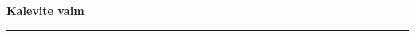 \documentclass[10pt]{book}
\begin{document}
{
  \samepage
  \raggedbottom
  \raggedright
  \sloppy


  \vspace{0.2in}

  \noindent\begin{minipage}{.1\textwidth}
    \hfill\vspace{0.1in}
  \end{minipage}%
  \noindent\begin{minipage}{.8\textwidth}
    \centering
    \bfseries
    \large Kalevite vaim
  \end{minipage}%
  \noindent\begin{minipage}{.1\textwidth}
      \hfill\vspace{0.1in}
  \end{minipage}

  \nopagebreak[4]
  \vspace{0.1in}
  \nopagebreak[4]
  \hrule height 0.05ex
  \nopagebreak[4]
  \vspace{-0.05in}




}
\end{document}
